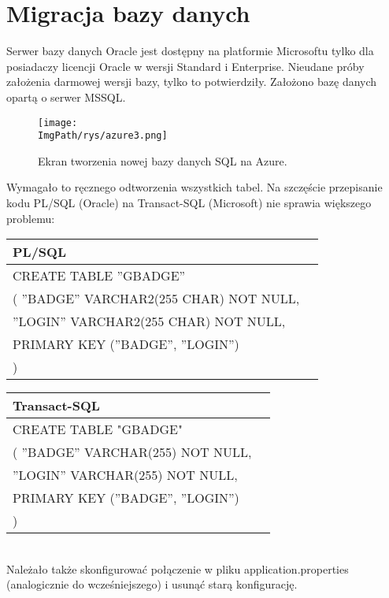 \documentclass[a4paper,12pt,twoside,openany]{report}
\newcommand{\ImgPath}{.}
\begin{document}
\section{Migracja bazy danych}
Serwer bazy danych Oracle jest dostępny na platformie Microsoftu tylko dla posiadaczy licencji Oracle w wersji Standard i Enterprise. Nieudane próby założenia darmowej wersji bazy, tylko to potwierdziły. Założono bazę danych opartą o serwer MSSQL.
				\begin{figure}[!htbp]
					\begin{center}
						\centering
						\texttt{[image: \\ImgPath/rys/azure3.png]}
					\end{center}
					\caption{Ekran tworzenia nowej bazy danych SQL na Azure.}
					\label{UMLTS}
				\end{figure}
Wymagało to ręcznego odtworzenia wszystkich tabel. Na szczęście przepisanie kodu PL/SQL (Oracle) na Transact-SQL (Microsoft) nie sprawia większego problemu:\\
\begin{tabular}{|l|l|}
	\hline PL/SQL\\ 
	\hline   CREATE TABLE ''GBADGE''  \\
	(	''BADGE'' VARCHAR2(255 CHAR) NOT NULL, \\
	''LOGIN'' VARCHAR2(255 CHAR) NOT NULL,  \\
	PRIMARY KEY (''BADGE'', ''LOGIN'')\\
	)\\
	\hline 
\end{tabular} 
\begin{tabular}{|l|l|}
	\hline Transact-SQL\\ 
	\hline CREATE TABLE "GBADGE" \\
	(	''BADGE'' VARCHAR(255) NOT NULL, \\
	''LOGIN'' VARCHAR(255) NOT NULL, \\
	PRIMARY KEY (''BADGE'', ''LOGIN'')\\
	)\\
	\hline 
\end{tabular}\\
Należało także skonfigurować połączenie w pliku application.properties (analogicznie do wcześniejszego) i usunąć starą konfigurację.
\end{document}
